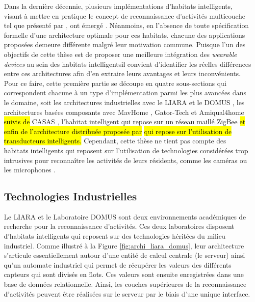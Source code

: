 Dans la dernière décennie, plusieurs implémentations d'habitats intelligents, visant à mettre en pratique le concept de reconnaissance d'activités multicouche tel que présenté par \cite{Roy2013}, ont émergé \citep{DJCook2003, Helal2005, Giroux2009, Cook2013, Bouchard2014, Lago2017}. Néanmoins, en l'absence de toute spécification formelle d'une architecture optimale pour ces habitats, chacune des applications proposées demeure différente malgré leur motivation commune. Puisque l'un des objectifs de cette thèse est de proposer une meilleure intégration des \textit{wearable devices} au sein des habitats intelligents\textemdash il convient d'identifier les réelles différences entre ces architectures afin d'en extraire leurs avantages et leurs inconvénients. Pour ce faire, cette première partie se découpe en quatre sous-sections qui correspondent chacune à un type d'implémentation parmi les plus avancées dans le domaine, soit les architectures industrielles avec le \acs{LIARA} \citep{Bouchard2014} et le \acs{DOMUS} \citep{Giroux2009}, les architectures basées composants avec MavHome \citep{DJCook2003}, Gator-Tech \citep{Helal2005} et Amiqual4home \citep{Lago2017} \hl{suivis de} CASAS \citep{Cook2013}, l'habitat intelligent qui repose sur un réseau maillé ZigBee \hl{et enfin de l'architecture distribuée proposée par} \cite{Plantevin2018} \hl{qui repose sur l'utilisation de transducteurs intelligents.} Cependant, cette thèse ne tient pas compte des habitats intelligents qui reposent sur l'utilisation de technologies considérées trop intrusives pour reconnaître les activités de leurs résidents, comme les caméras ou les microphones \citep{Brumitt2000, Vacher2011}.

\subsection{Technologies Industrielles}

Le \acs{LIARA} \citep{Bouchard2014} et le Laboratoire \acs{DOMUS} \citep{Giroux2009} sont deux environnements académiques de recherche pour la reconnaissance d'activités. Ces deux laboratoires disposent d'habitats intelligents qui reposent sur des technologies héritées du milieu industriel. Comme illustré à la Figure \ref{fig:archi_liara_domus}, leur architecture s'articule essentiellement autour d'une entité de calcul centrale (le serveur) ainsi qu'un automate industriel qui permet de récupérer les valeurs des différents capteurs qui sont divisés en îlots. Ces valeurs sont ensuite enregistrées dans une base de données relationnelle. Ainsi, les couches supérieures de la reconnaissance d'activités peuvent être réalisées sur le serveur par le biais d'une unique interface.

